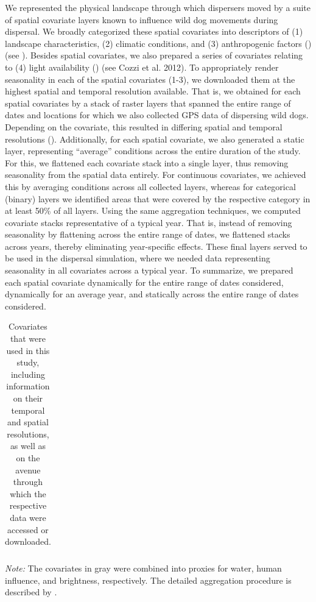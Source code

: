 \documentclass[abstract=on,10pt,a4paper,bibliography=totocnumbered]{article}
\begin{document}
We represented the physical landscape through which dispersers moved by a suite
of spatial covariate layers known to influence wild dog movements during
dispersal. We broadly categorized these spatial covariates into descriptors of
(1) landscape characteristics, (2) climatic conditions, and (3) anthropogenic
factors () (see \citealp{Hofmann.2021, Hofmann.2023}). Besides
spatial covariates, we also prepared a series of covariates relating to (4)
light availability () (see Cozzi et al. 2012). To appropriately
render seasonality in each of the spatial covariates (1-3), we downloaded them
at the highest spatial and temporal resolution available. That is, we obtained
for each spatial covariates by a stack of raster layers that spanned the entire
range of dates and locations for which we also collected GPS data of dispersing
wild dogs. Depending on the covariate, this resulted in differing spatial and
temporal resolutions (). Additionally, for each spatial
covariate, we also generated a static layer, representing ``average'' conditions
across the entire duration of the study. For this, we flattened each covariate
stack into a single layer, thus removing seasonality from the spatial data
entirely. For continuous covariates, we achieved this by averaging conditions
across all collected layers, whereas for categorical (binary) layers we
identified areas that were covered by the respective category in at least 50\%
of all layers. Using the same aggregation techniques, we computed covariate
stacks representative of a typical year. That is, instead of removing
seasonality by flattening across the entire range of dates, we flattened stacks
across years, thereby eliminating year-specific effects. These final layers
served to be used in the dispersal simulation, where we needed data representing
seasonality in all covariates across a typical year. To summarize, we prepared
each spatial covariate dynamically for the entire range of dates considered,
dynamically for an average year, and statically across the entire range of dates
considered.

\onehalfspacing
\begin{table}[htbp]
 \begin{center}
    \caption{Covariates that were used in this study, including information on
    their temporal and spatial resolutions, as well as on the avenue through which
    the respective data were accessed or downloaded.}
    \label{Covariates}
   \begin{threeparttable}
    \begin{tabular}{lcr}
      
    \end{tabular}
    \begin{tablenotes}
      \item \textit{Note:} The covariates in gray were combined into proxies for
      water, human influence, and brightness, respectively. The detailed
      aggregation procedure is described by \citet{Hofmann.2021}.
    \end{tablenotes}
   \end{threeparttable}
 \end{center}
\end{table}
\doublespacing
\end{document}
